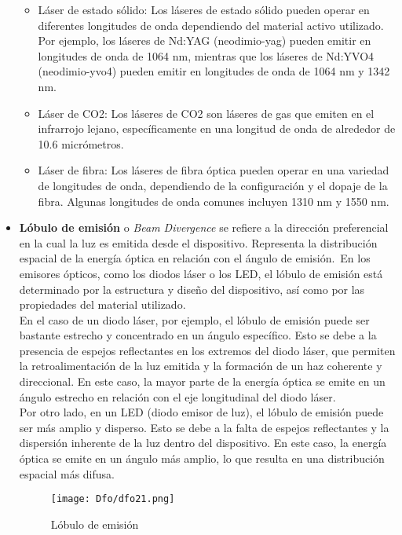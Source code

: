 \documentclass[12pt,fleqn,a4paper,oneside]{LegrandOrangeBook}
\begin{document}
\begin{itemize}
\begin{itemize}
\item Láser de estado sólido: Los láseres de estado sólido pueden operar en diferentes longitudes de onda dependiendo del material activo utilizado. Por ejemplo, los láseres de Nd:YAG (neodimio-yag) pueden emitir en longitudes de onda de 1064 nm, mientras que los láseres de Nd:YVO4 (neodimio-yvo4) pueden emitir en longitudes de onda de 1064 nm y 1342 nm.

\item Láser de CO2: Los láseres de CO2 son láseres de gas que emiten en el infrarrojo lejano, específicamente en una longitud de onda de alrededor de 10.6 micrómetros.

\item Láser de fibra: Los láseres de fibra óptica pueden operar en una variedad de longitudes de onda, dependiendo de la configuración y el dopaje de la fibra. Algunas longitudes de onda comunes incluyen 1310 nm y 1550 nm.
\end{itemize}
\item \textbf{Lóbulo de emisión} o \textit{Beam Divergence} se refiere a la dirección preferencial en la cual la luz es emitida desde el dispositivo. Representa la distribución espacial de la energía óptica en relación con el ángulo de emisión.\
En los emisores ópticos, como los diodos láser o los LED, el lóbulo de emisión está determinado por la estructura y diseño del dispositivo, así como por las propiedades del material utilizado.\\
En el caso de un diodo láser, por ejemplo, el lóbulo de emisión puede ser bastante estrecho y concentrado en un ángulo específico. Esto se debe a la presencia de espejos reflectantes en los extremos del diodo láser, que permiten la retroalimentación de la luz emitida y la formación de un haz coherente y direccional. En este caso, la mayor parte de la energía óptica se emite en un ángulo estrecho en relación con el eje longitudinal del diodo láser.\\
Por otro lado, en un LED (diodo emisor de luz), el lóbulo de emisión puede ser más amplio y disperso. Esto se debe a la falta de espejos reflectantes y la dispersión inherente de la luz dentro del dispositivo. En este caso, la energía óptica se emite en un ángulo más amplio, lo que resulta en una distribución espacial más difusa.
\begin{figure}[H]
\centering
\texttt{[image: Dfo/dfo21.png]}
\caption{Lóbulo de emisión}
\end{figure}

\end{itemize}
\end{document}
